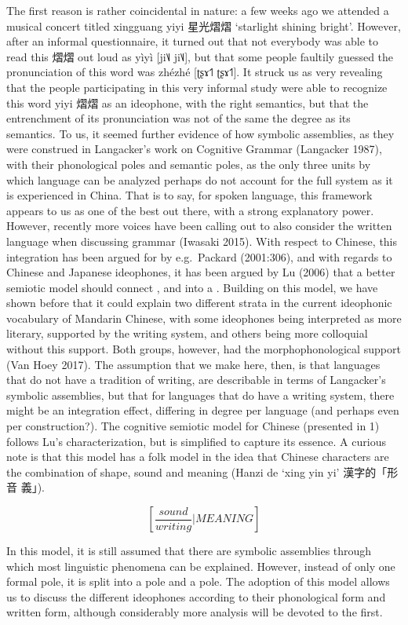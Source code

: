 The first reason is rather coincidental in nature: a few weeks ago we
attended a musical concert titled xingguang yiyi 星光熠熠 `starlight
shining bright'. However, after an informal questionnaire, it turned out
that not everybody was able to read this 熠熠 out loud as yìyì {[}ji˥˩
ji˥˩{]}, but that some people faultily guessed the pronunciation of this
word was zhézhé {[}ʈʂɤ˦˥ ʈʂɤ˦˥{]}. It struck us as very revealing that
the people participating in this very informal study were able to
recognize this word yiyi 熠熠 as an ideophone, with the right semantics,
but that the entrenchment of its pronunciation was not of the same the
degree as its semantics. To us, it seemed further evidence of how
symbolic assemblies, as they were construed in Langacker's work on
Cognitive Grammar (Langacker 1987), with their phonological poles and
semantic poles, as the only three units by which language can be
analyzed perhaps do not account for the full system as it is experienced
in China. That is to say, for spoken language, this framework appears to
us as one of the best out there, with a strong explanatory power.
However, recently more voices have been calling out to also consider the
written language when discussing grammar (Iwasaki 2015). With respect to
Chinese, this integration has been argued for by e.g.~Packard
(2001:306), and with regards to Chinese and Japanese ideophones, it has
been argued by Lu (2006) that a better semiotic model should connect ,
and into a . Building on this model, we have shown before that it could
explain two different strata in the current ideophonic vocabulary of
Mandarin Chinese, with some ideophones being interpreted as more
literary, supported by the writing system, and others being more
colloquial without this support. Both groups, however, had the
morphophonological support (Van Hoey 2017). The assumption that we make
here, then, is that languages that do not have a tradition of writing,
are describable in terms of Langacker's symbolic assemblies, but that
for languages that do have a writing system, there might be an
integration effect, differing in degree per language (and perhaps even
per construction?). The cognitive semiotic model for Chinese (presented
in 1) follows Lu's characterization, but is simplified to capture its
essence. A curious note is that this model has a folk model in the idea
that Chinese characters are the combination of shape, sound and meaning
(Hanzi de `xing yin yi' 漢字的「形 音 義」).

\[[\frac{sound}{writing}|MEANING]\]

In this model, it is still assumed that there are symbolic assemblies
through which most linguistic phenomena can be explained. However,
instead of only one formal pole, it is split into a pole and a pole. The
adoption of this model allows us to discuss the different ideophones
according to their phonological form and written form, although
considerably more analysis will be devoted to the first.

